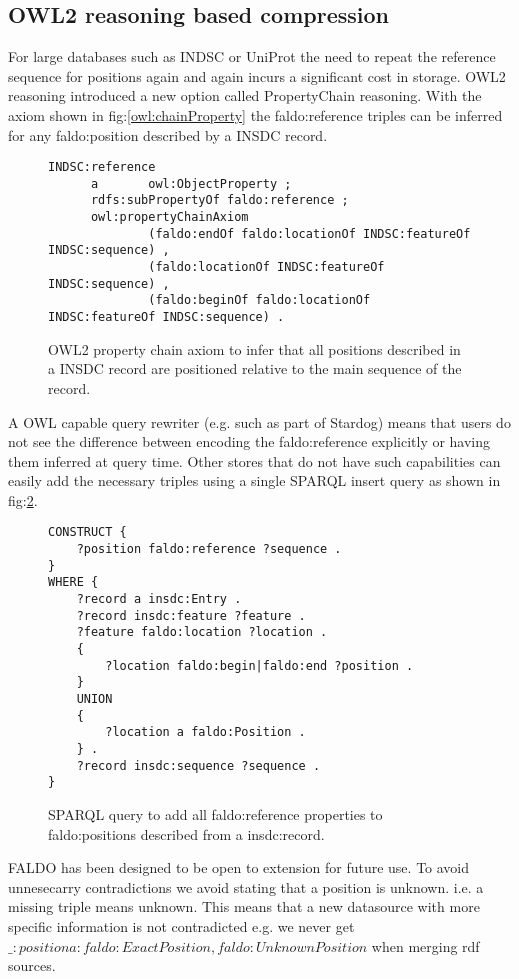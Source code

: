 \subsection*{OWL2 reasoning based compression}
For large databases such as INDSC or UniProt the need to repeat the reference sequence for positions again and again incurs a significant cost in storage.
OWL2 reasoning introduced a new option called PropertyChain reasoning. 
With the axiom shown in fig:\ref{owl:chainProperty} the faldo:reference triples can be inferred for any faldo:position described by a INSDC record.
\begin{figure}
\begin{verbatim}
INDSC:reference
      a       owl:ObjectProperty ;
      rdfs:subPropertyOf faldo:reference ;
      owl:propertyChainAxiom
              (faldo:endOf faldo:locationOf INDSC:featureOf INDSC:sequence) , 
              (faldo:locationOf INDSC:featureOf INDSC:sequence) , 
              (faldo:beginOf faldo:locationOf INDSC:featureOf INDSC:sequence) .

\end{verbatim}
\caption{OWL2 property chain axiom to infer that all positions described in a INSDC record are positioned relative to the main sequence of the record.}
\label{owl:chainProprty}
\end{figure}
A OWL capable query rewriter (e.g. such as part of Stardog) means that users do not see the difference between encoding the faldo:reference explicitly or having them inferred at query time.
Other stores that do not have such capabilities can easily add the necessary triples using a single SPARQL insert query as shown in fig:\ref{sparql:chainProperty}.
\begin{figure}
\begin{verbatim}
CONSTRUCT {
    ?position faldo:reference ?sequence .
}
WHERE {
    ?record a insdc:Entry .
    ?record insdc:feature ?feature .
    ?feature faldo:location ?location .
    {
        ?location faldo:begin|faldo:end ?position .
    }
    UNION
    {
        ?location a faldo:Position .
    } .
    ?record insdc:sequence ?sequence .
}
\end{verbatim}
\caption{SPARQL query to add all faldo:reference properties to faldo:positions described from a insdc:record.}
\label{sparql:chainProperty}
\end{figure}

FALDO has been designed to be open to extension for future use.
To avoid unnesecarry contradictions we avoid stating that a position is unknown.
i.e. a missing triple means unknown. 
This means that a new datasource with more specific information is not contradicted e.g.
we never get $\_:position a :faldo:ExactPosition,faldo:UnknownPosition$ when merging rdf sources.



